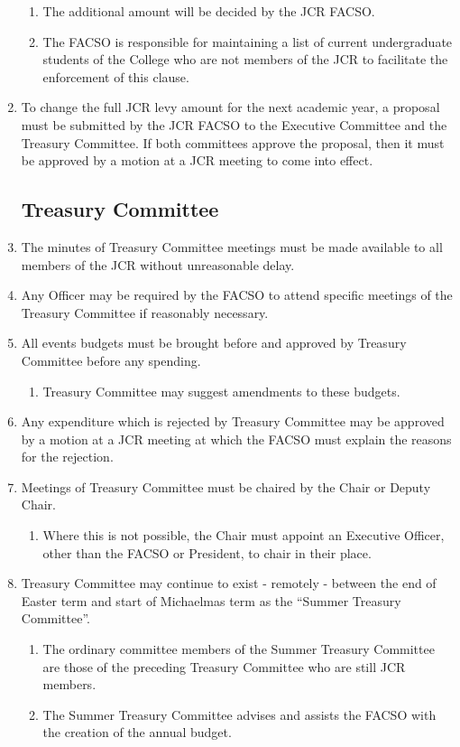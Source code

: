 \documentclass[12pt]{article}
\begin{document}
\begin{enumerate}
    \begin{enumerate}
        \item The additional amount will be decided by the JCR FACSO.
        \item The FACSO is responsible for maintaining a list of current undergraduate students of the College who are not members of the JCR to facilitate the enforcement of this clause.
    \end{enumerate}
    \item To change the full JCR levy amount for the next academic year, a proposal must be submitted by the JCR FACSO to the Executive Committee and the Treasury Committee. If both committees approve the proposal, then it must be approved by a motion at a JCR meeting to come into effect.
    \subsection{Treasury Committee}
    \item The minutes of Treasury Committee meetings must be made available to all members of the JCR without unreasonable delay.
    \item Any Officer may be required by the FACSO to attend specific meetings of the Treasury Committee if reasonably necessary.
    \item All events budgets must be brought before and approved by Treasury Committee before any spending.
    \begin{enumerate}
        \item Treasury Committee may suggest amendments to these budgets.
    \end{enumerate}
    \item Any expenditure which is rejected by Treasury Committee may be approved by a motion at a JCR meeting at which the FACSO must explain the reasons for the rejection.
    \item Meetings of Treasury Committee must be chaired by the Chair or Deputy Chair.
    \begin{enumerate}
        \item Where this is not possible, the Chair must appoint an Executive Officer, other than the FACSO or President, to chair in their place.
    \end{enumerate}
    \item Treasury Committee may continue to exist - remotely - between the end of Easter term and start of Michaelmas term as the ``Summer Treasury Committee''.
    \begin{enumerate}
        \item The ordinary committee members of the Summer Treasury Committee are those of the preceding Treasury Committee who are still JCR members.
        \item The Summer Treasury Committee advises and assists the FACSO with the creation of the annual budget.
    \end{enumerate}
\end{enumerate}
\end{document}
